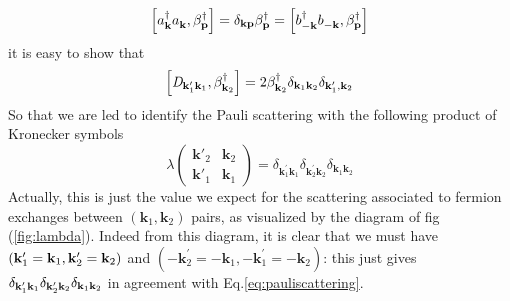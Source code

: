 \documentclass[aps,prb,superscriptaddress,twocolumn]{revtex4}
\newcommand{\vk}{\ensuremath{\mathbf{k}}}
\begin{document}
\begin{equation}  \label{eq:aBeta}
\left[a^{\dagger}_{\mathbf{k} }a^{}_{\mathbf{k} },\beta^{\dagger}_{\mathbf{p}
}\right]  =\delta_{\mathbf{k} \mathbf{p} }\beta^{\dagger}_{\mathbf{p} }=%
\left[b^{\dagger}_{-\mathbf{k} }b^{}_{-\mathbf{k} },\beta^{\dagger}_{\mathbf{%
p} }\right]  
\end{equation}
it is easy to show that 
\begin{equation}  \label{eq:Dcom}
\left[\mathit{D} _{\mathbf{k} ^{\prime}_1\mathbf{k} _1},\beta^{\dagger}_{%
\mathbf{k} _2}\right]  =2\beta^{\dagger}_{\mathbf{k} _2}\delta_{\mathbf{k} _1%
\mathbf{k} _2}\delta_{\mathbf{k} ^{\prime}_1,\mathbf{k} _2}
\end{equation}
So that we are led to identify the Pauli scattering with the following
product of Kronecker symbols 
\begin{equation}  \label{eq:pauliscattering}
\lambda\left(\begin{smallmatrix}\vk'_2&\vk_2\\\vk'_1&\vk_1\end{smallmatrix}%
\right)  =\delta_{\mathbf{k} ^{\prime}_1\mathbf{k} _1}\delta_{\mathbf{k}
^{\prime}_2\mathbf{k} _2}\delta_{\mathbf{k} _1\mathbf{k} _2}
\end{equation}
Actually, this is just the value we expect for the scattering associated to
fermion exchanges between $\left(\mathbf{k} _1,\mathbf{k} _2\right) $ pairs,
as visualized by the diagram of fig (\ref{fig:lambda}). Indeed from this
diagram, it is clear that we must have $\left(\mathbf{k} ^{\prime}_1=\mathbf{%
k} _1,\mathbf{k} ^{\prime}_2=\mathbf{k} _2\right) $ and $\left(-\mathbf{k}
^{\prime}_2=-\mathbf{k} _1,-\mathbf{k} ^{\prime}_1=-\mathbf{k} _2\right) $:
this just gives $\delta_{\mathbf{k} ^{\prime}_1\mathbf{k} _1}\delta_{\mathbf{%
k} ^{\prime}_2\mathbf{k} _2}\delta_{\mathbf{k} _1\mathbf{k} _2}$ in
agreement with Eq.\eqref{eq:pauliscattering}.
\end{document}
